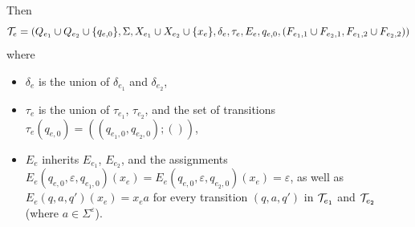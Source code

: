 Then 
\[\mathcal{T}_e = (Q_{e_1} \cup Q_{e_2} \cup \{q_{e,0}\}, \Sigma, X_{e_1} \cup X_{e_2} \cup \{x_e\}, 
		\delta_e, \tau_e, E_e, q_{e,0}, (F_{e_1,1} \cup F_{e_2,1}, F_{e_1,2} \cup F_{e_2,2}))\] where  
		\begin{itemize}
			\item $\delta_e$ is the union of $\delta_{e_1}$ and $\delta_{e_2}$,
			\item $\tau_e$ is the union of $\tau_{e_1}$, $\tau_{e_2}$, and the set of transitions $\tau_e(q_{e,0}) = ((q_{e_1,0},q_{e_2,0}); ())$,
			\item $E_e$ inherits $E_{e_1}$, $E_{e_2}$, and the assignments $E_e(q_{e,0}, \varepsilon, q_{e_1,0})(x_{e}) = E_e(q_{e,0}, \varepsilon, q_{e_2,0})(x_{e}) =\varepsilon$, as well as $E_e(q,a, q')(x_{e}) = x_e a$ for every transition $(q, a, q')$ in $\mathcal{T}_{e_1}$ and $\mathcal{T}_{e_2}$ (where $a \in \Sigma^\varepsilon$).
		\end{itemize}
